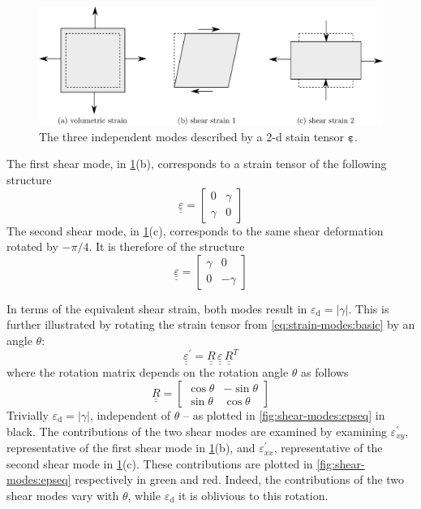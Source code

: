 \documentclass[fleqn, colorlinks]{goose-article}
\newcommand\T[1]{\underline{\bm{{#1}}}}
\begin{document}
\begin{figure}[htp]
    \centering
    \includegraphics[width=.7\textwidth]{figures/strain-modes_2d}
    \caption{The three independent modes described by a 2-d stain tensor $\T{\varepsilon}$.}
    \label{fig:strain-modes:2d}
\end{figure}

The first shear mode, in \cref{fig:strain-modes:2d}(b),
corresponds to a strain tensor of the following structure
\begin{equation}
    \label{eq:strain-modes:basic}
    \underline{\underline{\varepsilon}}
    =
    \begin{bmatrix}
        0 & \gamma \\
        \gamma & 0
    \end{bmatrix}
\end{equation}
The second shear mode, in \cref{fig:strain-modes:2d}(c),
corresponds to the same shear deformation rotated by $-\pi/4$.
It is therefore of the structure
\begin{equation}
    \underline{\underline{\varepsilon}}
    =
    \begin{bmatrix}
        \gamma & 0 \\
         0 & -\gamma
    \end{bmatrix}
\end{equation}

In terms of the equivalent shear strain, both modes result in $\varepsilon_\mathrm{d} = |\gamma|$.
This is further illustrated by rotating the strain tensor
from \cref{eq:strain-modes:basic} by an angle $\theta$:
\begin{equation}
    \underline{\underline{\varepsilon}}^\prime
    =
    \underline{\underline{R}} \,
    \underline{\underline{\varepsilon}} \,
    \underline{\underline{R}}^T
\end{equation}
where the rotation matrix depends on the rotation angle $\theta$ as follows
\begin{equation}
    \underline{\underline{R}}
    =
    \begin{bmatrix}
        \cos \theta & - \sin \theta \\
        \sin \theta & \cos \theta
    \end{bmatrix}
\end{equation}
Trivially $\varepsilon_\mathrm{d} = | \gamma |$, independent of $\theta$ --
as plotted in \cref{fig:shear-modes:epseq} in black.
The contributions of the two shear modes are examined by examining $\varepsilon^\prime_{xy}$,
representative of the first shear mode in \cref{fig:strain-modes:2d}(b),
and $\varepsilon^\prime_{xx}$,
representative of the second shear mode in \cref{fig:strain-modes:2d}(c).
These contributions are plotted in \cref{fig:shear-modes:epseq} respectively in green and red.
Indeed, the contributions of the two shear modes vary with $\theta$,
while $\varepsilon_\mathrm{d}$ it is oblivious to this rotation.
\end{document}
